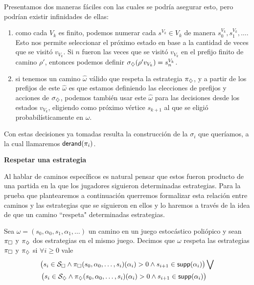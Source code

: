 \begin{boxgris}{}
	Presentamos dos maneras fáciles con las cuales se podría asegurar esto, pero
	podrían existir infinidades de ellas:
	\begin{enumerate}
		\item como cada $V_k$ es finito, podemos numerar cada $s^{V_k} \in V_k$ de manera
		      $s_0^{V_k}, s_1^{V_k}, \dots$. Esto nos permite seleccionar el próximo estado
		      en base a la cantidad de veces que se visitó $v_{V_k}$. Si $n$ fueron las veces
		      que se visitó $v_{V_k}$ en el prefijo finito de camino $\rho '$, entonces
		      podemos definir $\sigma_\diamondsuit(\rho ' v_{V_k}) = s_n^{V_k}$.
		\item si tenemos un camino $\hat \omega$ válido que respeta la estrategia
		      $\pi_\diamondsuit$, y a partir de los prefijos de este $\hat \omega$ es que estamos
		      definiendo las elecciones de prefijos y acciones de $\sigma_\diamondsuit$, podemos
		      también usar este $\hat \omega$ para las decisiones desde los estados
		      $v_{V_k}$, eligiendo como próximo vértice $s_{k+1}$ al que se eligió
		      probabilísticamente en $\hat \omega$.
	\end{enumerate}
\end{boxgris}

Con estas decisiones ya tomadas resulta la construcción de la $\sigma_i$ que
queríamos, a la cual llamaremos $\textsf{derand}(\pi_i)$.

\textbf{Respetar una estrategia}

Al hablar de caminos específicos es natural pensar que estos fueron producto de
una partida en la que los jugadores siguieron determinadas estrategias. Para la
prueba que plantearemos a continuación querremos formalizar esta relación entre
caminos y las estrategias que se siguieron en ellos y lo haremos a través de la
idea de que un camino ``respeta" determinadas estrategias.

Sea $\omega = (s_0, \alpha_0, s_1, \alpha_1, \dots)$ un camino en un juego
estocástico poliópico y sean $\pi_\square$ y $\pi_\diamondsuit$ dos estrategias en el mismo
juego. Decimos que $\omega$ respeta las estrategias $\pi_\square$ y $\pi_\diamondsuit$ si
$\forall i \geq 0$ vale
\begin{align*}
	&\bigl( s_i \in \mathcal{S}_\square \wedge \pi_\square(s_0, \alpha_0, \dots, s_i)(\alpha_i) > 0 \wedge s_{i+1} \in \textsf{supp}(\alpha_i) \bigr) \bigvee \\
	&\left(s_i \in \mathcal{S}_\diamondsuit \wedge \pi_\diamondsuit(s_0, \alpha_0, \dots, s_i)(\alpha_i) > 0 \wedge
	s_{i+1} \in \textsf{supp}(\alpha_i) \right)
\end{align*}

